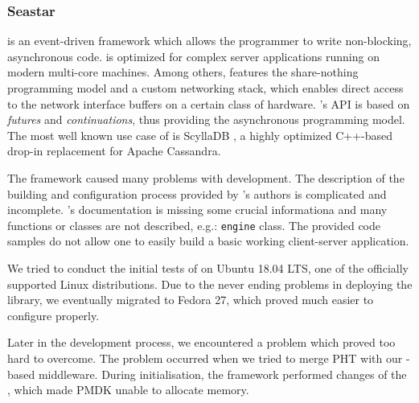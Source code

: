         \subsubsection{Seastar}
            \Seastar is an event-driven framework which allows the programmer to write non-blocking, asynchronous code. \Seastar is optimized for complex server applications running on modern multi-core machines. Among others, \Seastar features the share-nothing programming model and a custom networking stack, which enables direct access to the network interface buffers on a certain class of hardware. \Seastar's API is based on \textit{futures} and \textit{continuations}, thus providing the asynchronous programming model. The most well known use case of \Seastar is ScyllaDB \cite{ScyllaDB}, a highly optimized C++-based drop-in replacement for Apache Cassandra.
            
            The \Seastar framework caused many problems with development. The description of the building and configuration process provided by \Seastar's authors is complicated and incomplete. \Seastar's  documentation is missing some crucial informationa and many functions or classes are not described, e.g.: \texttt{engine} class. The provided code samples do not allow one to easily build a basic working client-server application.
            
            We tried to conduct the initial tests of \Seastar on Ubuntu 18.04 LTS, one of the officially supported Linux distributions. Due to the never ending problems in deploying the library, we eventually migrated to Fedora 27, which proved much easier to configure properly. 
            
            Later in the development process, we encountered a problem which proved too hard to overcome. The problem occurred when we tried to merge PHT with our \Seastar-based middleware. During initialisation, the \Seastar framework performed changes of the  \cite{Hugepages}, which made PMDK unable to allocate memory.
            
